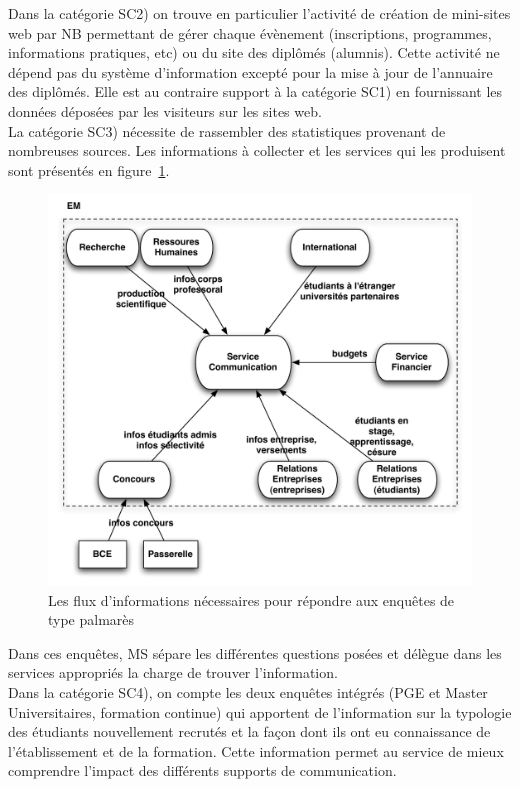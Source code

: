 \documentclass{book}
\begin{document}
Dans la catégorie SC2) on trouve en particulier l'activité de création
de mini-sites web par NB permettant de gérer chaque évènement (inscriptions,
programmes, informations pratiques, etc) ou du site des diplômés (alumnis).
Cette activité ne dépend pas du système d'information excepté pour
la mise à jour de l'annuaire des diplômés. Elle est au contraire 
support à la catégorie SC1) en fournissant les données déposées par les
visiteurs sur les sites web.\\ 

La catégorie SC3) nécessite de rassembler des statistiques provenant de 
nombreuses sources. Les informations à collecter et les services qui les 
produisent sont présentés en figure~\ref{fg:comm_flux}.
\begin{figure}[hbt]
\begin{center}
\includegraphics[width=.75\linewidth]{figs/comm_flux.pdf}
\end{center}
\caption{Les flux d'informations nécessaires pour répondre aux enquêtes de type palmarès}
\label{fg:comm_flux}
\end{figure}
Dans ces enquêtes, MS sépare les différentes questions posées et délègue
dans les services appropriés la charge de trouver l'information.\\


Dans la catégorie SC4), on compte les deux enquêtes intégrés (PGE et Master 
Universitaires, formation continue) qui apportent de l'information sur la 
typologie des étudiants nouvellement recrutés et la façon dont ils ont eu 
connaissance de l'établissement et de la formation. Cette information permet 
au service de mieux comprendre l'impact des différents supports de communication.
\end{document}
